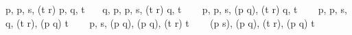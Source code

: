 \documentclass{article}
\begin{document}
\prooftree
\prooftree
\prooftree
\prooftree
p, p, s, (t \to r) \vdash p, q, t \ \ \ 
q, p, p, s, (t \to r) \vdash q, t \ \ \ 
\justifies
p, p, s, (p \to q), (t \to r) \vdash q, t \ \ \ 
\endprooftree
\justifies
p, p, s, \lnot q, (t \to r), (p \to q) \vdash t \ \ \ 
\endprooftree
\justifies
p, s, (p \land \lnot q), (p \to q), (t \to r) \vdash t \ \ \ 
\endprooftree
\justifies
(p \land s), (p \land \lnot q), (t \to r), (p \to q) \vdash t \ \ \ 
\endprooftree
\end{document}
